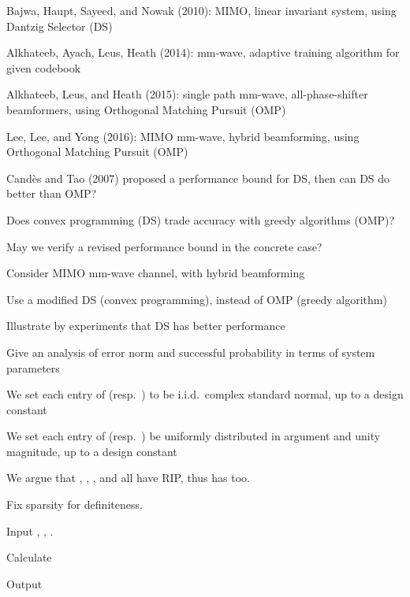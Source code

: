 {
\I Bajwa, Haupt, Sayeed, and Nowak (2010): MIMO, linear invariant system, using Dantzig Selector (DS)

\I Alkhateeb, Ayach, Leus, Heath (2014): mm-wave, adaptive training algorithm for given codebook

\I Alkhateeb, Leus, and Heath (2015): single path mm-wave, all-phase-shifter beamformers, using Orthogonal Matching Pursuit (OMP)

\I Lee, Lee, and Yong (2016): MIMO mm-wave, hybrid beamforming, using Orthogonal Matching Pursuit (OMP)
}
{
\I Candès and Tao (2007) proposed a performance bound for DS, then can DS do better than OMP?

\I Does convex programming (DS) trade accuracy with greedy algorithms (OMP)?

\I May we verify a revised performance bound in the concrete case?
}
{
\I Consider MIMO mm-wave channel, with hybrid beamforming

\I Use a modified DS (convex programming), instead of OMP (greedy algorithm)

\I Illustrate by experiments that DS has better performance

\I Give an analysis of error norm and successful probability in terms of system parameters
}
{
\I We set each entry of  (resp.\ ) to be i.i.d.\ complex standard normal, up to a design constant

\I We set each entry of  (resp.\ ) be uniformly distributed in argument and unity magnitude, up to a design constant

\I We argue that , , , and  all have RIP, thus  has too.
}
{
\I Fix sparsity  for definiteness.

\I Input , , .

\I Calculate

\I Output 
}


